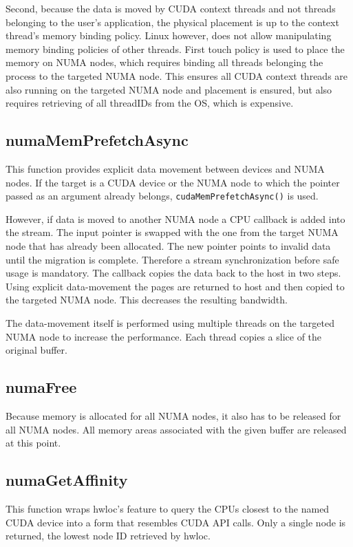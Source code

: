Second, because the data is moved by CUDA context threads and not threads belonging to the user's application, the physical placement is up to the context thread's memory binding policy. Linux however, does not allow manipulating memory binding policies of other threads. First touch policy is used to place the memory on NUMA nodes, which requires binding all threads
belonging the process to the targeted NUMA node. This ensures all CUDA context threads are also running on the targeted NUMA node and placement is ensured, but also  requires retrieving
of all threadIDs from the OS, which is expensive.

\subsection*{numaMemPrefetchAsync}
This function provides explicit data movement between devices and NUMA nodes. If the target is
a CUDA device or the NUMA node to which the pointer passed as an argument already belongs, \verb|cudaMemPrefetchAsync()| is used.

However, if data is moved to another NUMA node a CPU
callback is added into the stream. The input pointer is swapped with the one from the target NUMA node that has already been
allocated. The new pointer points to invalid data until the migration is complete. Therefore a stream synchronization before safe usage is mandatory. The callback copies the data back to the host
in two steps. Using explicit data-movement the pages are returned to host and then copied to the targeted NUMA node. This decreases the resulting bandwidth.

The data-movement itself is performed using multiple threads on the targeted NUMA node to increase the performance. Each thread copies a slice of the original buffer.
\subsection*{numaFree}
Because memory is allocated for all NUMA nodes, it also has to be released for all NUMA nodes. All memory areas associated with the given buffer are released at this point. 
\subsection*{numaGetAffinity}
This function wraps hwloc's feature to query the CPUs closest to the named CUDA device into
a form that resembles CUDA API calls. Only a single node is returned, the lowest node ID retrieved by hwloc.